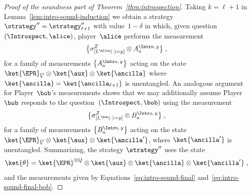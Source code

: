 \begin{proof}[Proof of the soundness part of Theorem~\ref{thm:introspection}]
  Taking $k = \ell+1$ in Lemma~\ref{lem:intro-sound-induction} we obtain a
  strategy $\strategy''=\strategy''_{\ell+1}$ with value~$1-\delta$ in which,
  given question $(\Introspect, \alice)$, player~$\alice$ performs the
  measurement
  \begin{equation}
    \label{eq:intro-sound-final}
    \bigl\{ \z[{[L^\alice(\cdot)=y]}] \otimes A^{\Intro,\, y}_a \bigr\} \;,
  \end{equation}
  for a family of measurements $\bigl\{ A^{\Intro,\, y}_a \bigr\}$ acting on the
  state $\ket{\EPR}_{\overline{V}} \otimes \ket{\aux} \otimes \ket{\ancilla}$
where $\ket{\ancilla}=\ket{\ancilla_{\ell+1}}$ is unentangled.
  An analogous argument for Player~$\bob$'s measurements shows that we may
  additionally assume Player~$\bob$ responds to the question~$(\Introspect,
  \bob)$ using the measurement
  \begin{equation}
    \label{eq:intro-sound-final-bob}
    \bigl\{\sigma^Z_{[L^\bob(\cdot)=y]} \otimes
    B^{\Intro,\, y}_a\bigr\}\;,  
  \end{equation}
  for a family of measurements $\bigl\{ B^{\Intro,\, y}_a \bigr\}$ acting on the
  state $\ket{\EPR}_{\overline{V}} \otimes\ket{\aux} \otimes \ket{\ancilla'}$,
  where $\ket{\ancilla'}$ is unentangled.
  Summarizing, the strategy $\strategy''$ uses the state
  \begin{equation*}
    \ket{\theta} = \ket{\EPR}^{\otimes Q} \otimes \ket{\aux} \otimes
    \ket{\ancilla} \otimes \ket{\ancilla'}\;,
  \end{equation*}
  and the measurements given by Equations~\eqref{eq:intro-sound-final}
  and~\eqref{eq:intro-sound-final-bob}.
  

\end{proof}
